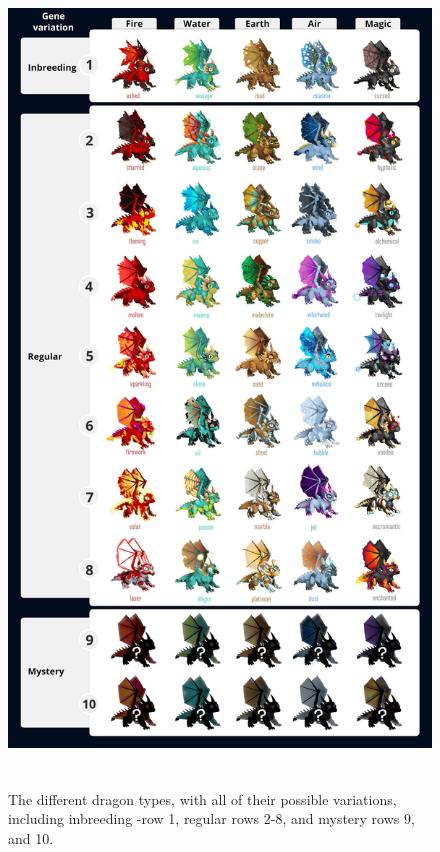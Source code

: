 \documentclass[12pt]{article}
\begin{document}
\begin{Center}

\begin{figure}[!ht]
	\begin{Center}
		\includegraphics[width=4.85in,height=8.48in]{./media/image14.jpg}
		\caption{The different dragon types, with all of their possible variations, including inbreeding -row 1, regular rows 2-8, and mystery rows 9, and 10.}
		\label{fig:The_different_dragon_types_with_all_of_their_possible_variations_including_inbreeding_row_1_regular_rows_28_and_mystery_rows_9_and_10}
	\end{Center}
\end{figure}





\end{Center}\par
\end{document}
